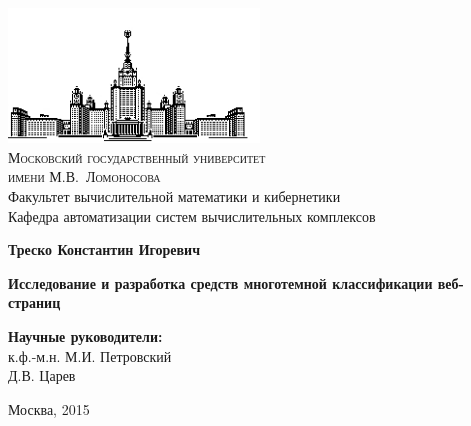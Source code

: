 \documentclass[russian, utf8, emptystyle]{eskdtext}
\begin{document}
\thispagestyle{empty}

\begin{center}
	\ \vspace{-2cm}
	
	\includegraphics[width=0.5\textwidth]{msu.jpg}\\
	{\scshape Московский государственный университет \\ имени М.В.~Ломоносова}\\
	Факультет вычислительной математики и кибернетики\\
	Кафедра  автоматизации систем вычислительных комплексов
	
	\vspace{4cm}
	
	\textbf{{\Large Треско Константин Игоревич}}
	
	\vspace{1cm}
	
	{\Huge\bfseries
	Исследование и разработка средств многотемной классификации веб-страниц\\}
\end{center}

\vspace{1cm}


\vspace{2cm}

\vfill

\begin{flushright}
	\normalsize
	\textbf{Научные руководители:}\\
	к.ф.-м.н. М.И. Петровский\\
	Д.В. Царев
\end{flushright}

\vfill

\begin{center}
	Москва, 2015
\end{center}

\enlargethispage{4\baselineskip}
\end{document}

